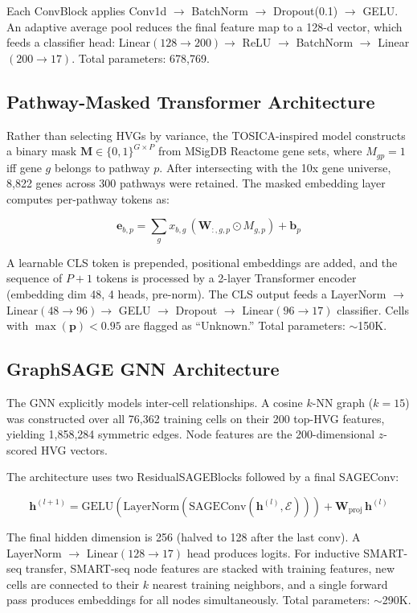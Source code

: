 \documentclass[11pt,letterpaper]{article}
\begin{document}
\noindent Each ConvBlock applies Conv1d $\to$ BatchNorm $\to$ Dropout(0.1) $\to$
GELU\@. An adaptive average pool reduces the final feature map to a 128-d vector,
which feeds a classifier head: Linear$(128 \to 200) \to$ ReLU $\to$
BatchNorm $\to$ Linear$(200 \to 17)$. Total parameters: 678,769.

\subsection{Pathway-Masked Transformer Architecture}
Rather than selecting HVGs by variance, the TOSICA-inspired model constructs a
binary mask $\mathbf{M} \in \{0,1\}^{G \times P}$ from MSigDB Reactome gene
sets, where $M_{gp}=1$ iff gene $g$ belongs to pathway $p$. After intersecting
with the 10x gene universe, 8,822 genes across 300 pathways were retained. The
masked embedding layer computes per-pathway tokens as:

\[
\mathbf{e}_{b,p} = \sum_{g} x_{b,g}\,(\mathbf{W}_{:,g,p} \odot M_{g,p}) + \mathbf{b}_p
\]

\noindent A learnable CLS token is prepended, positional embeddings are added,
and the sequence of $P{+}1$ tokens is processed by a 2-layer Transformer
encoder (embedding dim 48, 4 heads, pre-norm). The CLS output feeds a
LayerNorm $\to$ Linear$(48 \to 96) \to$ GELU $\to$ Dropout $\to$ Linear$(96
\to 17)$ classifier. Cells with $\max(\mathbf{p}) < 0.95$ are flagged as
``Unknown.'' Total parameters: $\sim$150K.

\subsection{GraphSAGE GNN Architecture}
The GNN explicitly models inter-cell relationships. A cosine $k$-NN graph
($k{=}15$) was constructed over all 76,362 training cells on their 200
top-HVG features, yielding 1,858,284 symmetric edges. Node features are the
200-dimensional $z$-scored HVG vectors.

The architecture uses two ResidualSAGEBlocks followed by a final SAGEConv:

\[
\mathbf{h}^{(l+1)} = \text{GELU}(\text{LayerNorm}(\text{SAGEConv}(\mathbf{h}^{(l)}, \mathcal{E}))) + \mathbf{W}_\text{proj}\,\mathbf{h}^{(l)}
\]

\noindent The final hidden dimension is 256 (halved to 128 after the last conv).
A LayerNorm $\to$ Linear$(128 \to 17)$ head produces logits. For inductive
SMART-seq transfer, SMART-seq node features are stacked with training features,
new cells are connected to their $k$ nearest training neighbors, and a single
forward pass produces embeddings for all nodes simultaneously. Total parameters:
$\sim$290K.
\end{document}
